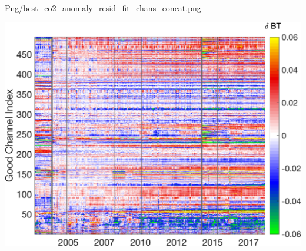 \documentclass[10pt,t]{beamer}
\begin{document}
\begin{frame}[label={sec:org41fcac8}]{Png/best\_co2\_anomaly\_resid\_fit\_chans\_concat.png}
\begin{center}
\includegraphics[width=0.7\linewidth]{./Figs/Png/best_co2_anomaly_resid_fit_chans_concat.png}
\end{center}
\end{frame}
\end{document}

